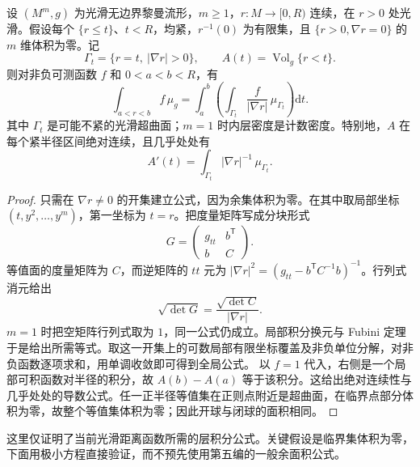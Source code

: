 \begin{lemma}\label{g3:lem:smooth-radial-layer-integration}
	设 \((M^m,g)\) 为光滑无边界黎曼流形，\(m\ge1\)，\(r:M\to[0,R)\) 连续，在 \(r>0\) 处光滑。假设每个 \(\{r\le t\}\)、\(t<R\)，均紧，\(r^{-1}(0)\) 为有限集，且 \(\{r>0,\nabla r=0\}\) 的 \(m\) 维体积为零。记
	\[
		\Gamma_t=\{r=t,\ |\nabla r|>0\},\qquad
		A(t)=\operatorname{Vol}_g\{r<t\}.
	\]
	则对非负可测函数 \(f\) 和 \(0<a<b<R\)，有
	\begin{equation}\label{g3:eq:smooth-radial-layer-formula}
		\int_{a<r<b}f\,\mu_g
		=\int_a^b\left(\int_{\Gamma_t}\frac{f}{|\nabla r|}\,\mu_{\Gamma_t}\right)\mathrm dt.
	\end{equation}
	其中 \(\Gamma_t\) 是可能不紧的光滑超曲面；\(m=1\) 时内层密度是计数密度。特别地，\(A\) 在每个紧半径区间绝对连续，且几乎处处有
	\begin{equation}\label{g3:eq:radial-area-derivative}
		A'(t)=\int_{\Gamma_t}|\nabla r|^{-1}\,\mu_{\Gamma_t}.
	\end{equation}
\end{lemma}
\begin{proof}
	只需在 \(\nabla r\ne0\) 的开集建立公式，因为余集体积为零。在其中取局部坐标 \((t,y^2,\ldots,y^m)\)，第一坐标为 \(t=r\)。把度量矩阵写成分块形式
	\[
		G=\begin{pmatrix}g_{tt}&b^{\mathsf T}\\b&C\end{pmatrix}.
	\]
	等值面的度量矩阵为 \(C\)，而逆矩阵的 \(tt\) 元为
	\(|\nabla r|^2=(g_{tt}-b^{\mathsf T}C^{-1}b)^{-1}\)。行列式消元给出
	\[
		\sqrt{\det G}=\frac{\sqrt{\det C}}{|\nabla r|}.
	\]
	\(m=1\) 时把空矩阵行列式取为 \(1\)，同一公式仍成立。局部积分换元与 Fubini 定理于是给出所需等式。取这一开集上的可数局部有限坐标覆盖及非负单位分解，对非负函数逐项求和，用单调收敛即可得到全局公式。
	以 \(f=1\) 代入，右侧是一个局部可积函数对半径的积分，故 \(A(b)-A(a)\) 等于该积分。这给出绝对连续性与几乎处处的导数公式。任一正半径等值集在正则点附近是超曲面，在临界点部分体积为零，故整个等值集体积为零；因此开球与闭球的面积相同。
\end{proof}

这里仅证明了当前光滑距离函数所需的层积分公式。关键假设是临界集体积为零，下面用极小方程直接验证，而不预先使用第五编的一般余面积公式。

